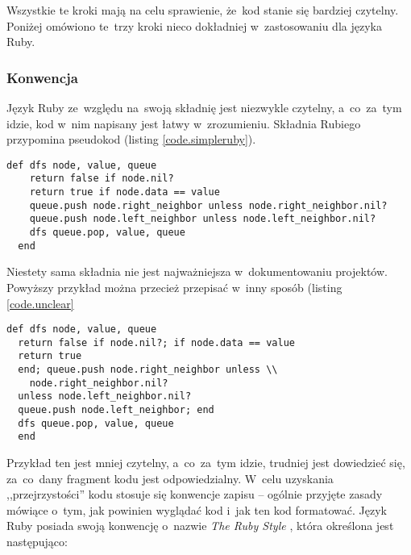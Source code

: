 Wszystkie te kroki mają na celu sprawienie, że~kod stanie się bardziej czytelny. Poniżej omówiono te~trzy kroki nieco dokładniej w~zastosowaniu dla języka Ruby.

\subsubsection{Konwencja} \label{dokumentacja.konwencja}

Język Ruby ze~względu na~swoją składnię jest niezwykle czytelny, a~co~za~tym idzie, kod w~nim napisany jest łatwy w~zrozumieniu. Składnia Rubiego przypomina pseudokod (listing \ref{code.simpleruby}).

  \begin{lstlisting}[label={code.simpleruby}]
  def dfs node, value, queue
    return false if node.nil?
    return true if node.data == value
    queue.push node.right_neighbor unless node.right_neighbor.nil?
    queue.push node.left_neighbor unless node.left_neighbor.nil?
    dfs queue.pop, value, queue
  end
  \end{lstlisting}

Niestety sama składnia nie jest najważniejsza w~dokumentowaniu projektów. Powyższy przykład można przecież przepisać w~inny sposób (listing \ref{code.unclear}

  \begin{lstlisting}[label={code.unclear}]
  def dfs node, value, queue
  return false if node.nil?; if node.data == value
  return true
  end; queue.push node.right_neighbor unless \\
    node.right_neighbor.nil?
  unless node.left_neighbor.nil?
  queue.push node.left_neighbor; end
  dfs queue.pop, value, queue
  end
  \end{lstlisting}

Przykład ten jest mniej czytelny, a~co~za~tym idzie, trudniej jest dowiedzieć się, za~co~dany fragment kodu jest odpowiedzialny. W~celu uzyskania ,,przejrzystości'' kodu stosuje się konwencje zapisu -- ogólnie przyjęte zasady mówiące o~tym, jak powinien wyglądać kod i~jak ten kod formatować. Język Ruby posiada swoją konwencję o~nazwie \textit{The Ruby Style} \cite{therubyway}, która określona jest następująco:

